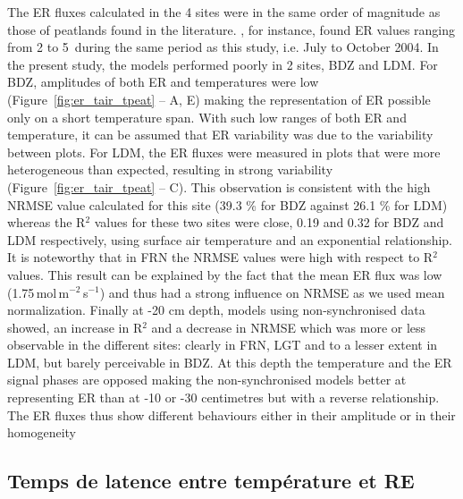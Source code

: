 The ER fluxes calculated in the 4 sites were in the same order of magnitude as those of peatlands found in the literature.
\citet{bortoluzzi2006}, for instance, found ER values ranging from 2 to 5\, during the same period as this study, i.e. July to October 2004.
In the present study, the models performed poorly in 2 sites, BDZ and LDM.
For BDZ, amplitudes of both ER and temperatures were low  (Figure~\ref{fig:er_tair_tpeat} -- A, E) making the representation of ER possible only on a short temperature span.
With such low ranges of both ER and temperature, it can be assumed that ER variability was due to the variability between plots.
For LDM, the ER fluxes were measured in plots that were more heterogeneous than expected, resulting in strong variability (Figure~\ref{fig:er_tair_tpeat} -- C).
This observation is consistent with the high NRMSE value calculated for this site (39.3 \% for BDZ against 26.1 \% for LDM) whereas the R$^{2}$ values for these two sites were close, 0.19 and 0.32 for BDZ and LDM respectively, using surface air temperature and an exponential relationship.
It is noteworthy that in FRN the NRMSE values were high with respect to R$^{2}$ values.
This result can be explained by the fact that the mean ER flux was low (1.75\,\textmu mol\,m$^{-2}$\,s$^{-1}$) and thus had a strong influence on NRMSE as we used mean normalization.
Finally at -20 cm depth, models using non-synchronised data showed, an increase in R$^{2}$ and a decrease in NRMSE which was more or less observable in the different sites:
clearly in FRN, LGT and to a lesser extent in LDM, but barely perceivable in BDZ.
At this depth the temperature and the ER signal phases are opposed making the non-synchronised models better at representing ER than at -10 or -30 centimetres but with a reverse relationship.
The ER fluxes thus show different behaviours either in their amplitude or in their homogeneity

\subsection{Temps de latence entre température et RE}

